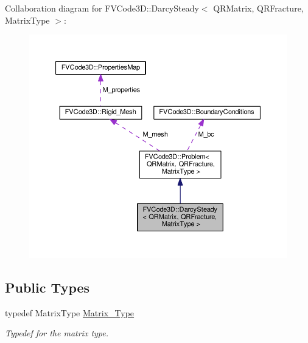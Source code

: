 Collaboration diagram for F\+V\+Code3D\+:\+:Darcy\+Steady$<$ Q\+R\+Matrix, Q\+R\+Fracture, Matrix\+Type $>$\+:
\nopagebreak
\begin{figure}[H]
\begin{center}
\leavevmode
\includegraphics[width=350pt]{classFVCode3D_1_1DarcySteady__coll__graph}
\end{center}
\end{figure}
\subsection*{Public Types}
\begin{DoxyCompactItemize}
\item 
typedef Matrix\+Type \hyperlink{classFVCode3D_1_1DarcySteady_aa06573b2c5767486a09fb33c4b0cb480}{Matrix\+\_\+\+Type}
\begin{DoxyCompactList}\small\item\em Typedef for the matrix type. \end{DoxyCompactList}\end{DoxyCompactItemize}
